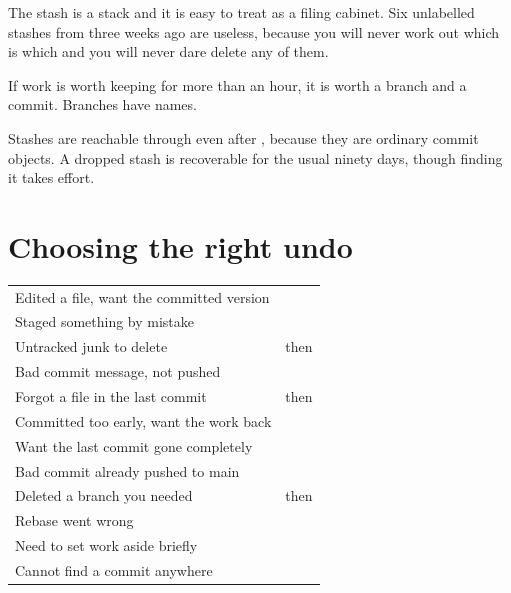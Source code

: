\documentclass[11pt]{article}
\begin{document}
\begin{trap}
The stash is a stack and it is easy to treat as a filing cabinet. Six unlabelled
stashes from three weeks ago are useless, because you will never work out which is
which and you will never dare delete any of them.

If work is worth keeping for more than an hour, it is worth a branch and a commit.
Branches have names.
\end{trap}

\begin{note}
Stashes are reachable through  even after ,
because they are ordinary commit objects. A dropped stash is recoverable for the
usual ninety days, though finding it takes effort.
\end{note}

\section{Choosing the right undo}

\vspace{0.5em}
\begin{tabularx}{\linewidth}{@{}L{6.4cm} X@{}}
\toprule
{} &  \\
\midrule
Edited a file, want the committed version &  \\
Staged something by mistake &  \\
Untracked junk to delete &  then  \\
Bad commit message, not pushed &  \\
Forgot a file in the last commit &  then  \\
Committed too early, want the work back &  \\
Want the last commit gone completely &  \\
Bad commit already pushed to main &  \\
Deleted a branch you needed &  then  \\
Rebase went wrong &  \\
Need to set work aside briefly &  \\
Cannot find a commit anywhere &  \\
\bottomrule
\end{tabularx}
\vspace{0.5em}
\end{document}
